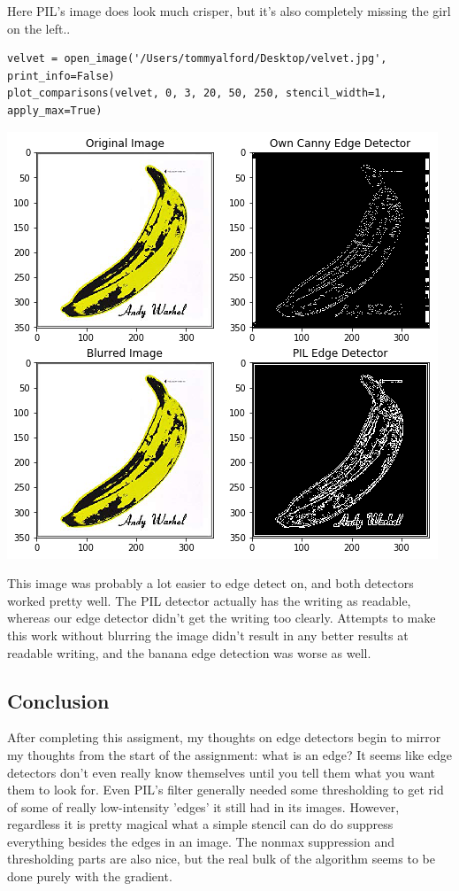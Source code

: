 \documentclass[11pt]{article}
\begin{document}
Here PIL's image does look much crisper, but it's also completely missing the
girl on the left..


\begin{verbatim}
velvet = open_image('/Users/tommyalford/Desktop/velvet.jpg', print_info=False)
plot_comparisons(velvet, 0, 3, 20, 50, 250, stencil_width=1, apply_max=True)
\end{verbatim}

\includegraphics[width=.9\linewidth]{./obipy-resources/333NeH.png}

This image was probably a lot easier to edge detect on, and both detectors
worked pretty well. The PIL detector actually has the writing as readable,
whereas our edge detector didn't get the writing too clearly. Attempts to make
this work without blurring the image didn't result in any better results at
readable writing, and the banana edge detection was worse as well.

\subsection*{Conclusion}
\label{sec-6-2}
After completing this assigment, my thoughts on edge detectors begin to mirror
my thoughts from the start of the assignment: what is an edge? It seems like
edge detectors don't even really know themselves until you tell them what you
want them to look for. Even PIL's filter generally needed some thresholding to
get rid of some of really low-intensity 'edges' it still had in its
images. However, regardless it is pretty magical what a simple stencil can do
do suppress everything besides the edges in an image. The nonmax suppression
and thresholding parts are also nice, but the real bulk of the algorithm seems
to be done purely with the gradient.
\end{document}
